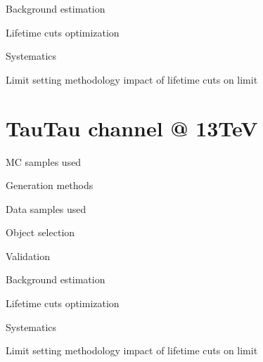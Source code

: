 Background estimation

Lifetime cuts
	optimization 
	
Systematics

Limit setting methodology
	impact of lifetime cuts on limit
	
\section{TauTau channel @ 13TeV}

MC samples used

	Generation methods
	
Data samples used

Object selection

Validation

Background estimation

Lifetime cuts
	optimization 
	
Systematics

Limit setting methodology
	impact of lifetime cuts on limit















